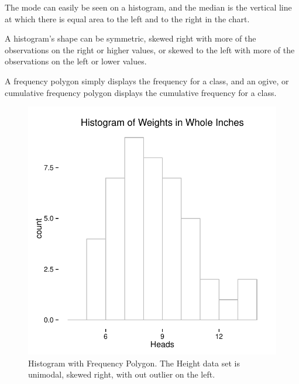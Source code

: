 \documentclass[nohyper,justified]{tufte-handout}\usepackage[]{graphicx}\usepackage[]{color}
\makeatletter
\def\maxwidth{ %
  \ifdim\Gin@nat@width>\linewidth
    \linewidth
  \else
    \Gin@nat@width
  \fi
}
\newenvironment{knitrout}{}{} %
\makeatother
\begin{document}
The mode can easily be seen on a histogram, and the median is the vertical line at which there is equal area to the left and to the right in the chart. 

A histogram's shape can be symmetric, skewed right with more of the observations on the right or higher values, or skewed to the left with more of the observations on the left or lower values.

A frequency polygon simply displays the frequency for a class, and an ogive, or cumulative frequency polygon displays the cumulative frequency for a class. 

\begin{knitrout}
\color{fgcolor}\begin{figure}[h!]

{\centering \includegraphics[width=\maxwidth]{figure/graphics-histogram-1} 

}

\caption[Histogram with Frequency Polygon]{Histogram with Frequency Polygon. The Height data set is unimodal, skewed right, with out outlier on the left. }\label{fig:histogram}
\end{figure}


\end{knitrout}
\end{document}
